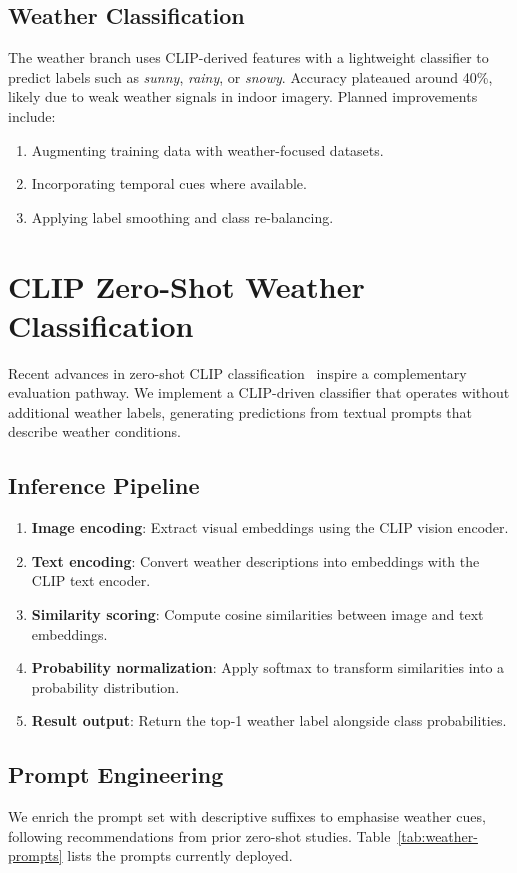 \documentclass[10pt,twocolumn]{article}
\begin{document}
\subsection{Weather Classification}
The weather branch uses CLIP-derived features with a lightweight classifier to predict labels such as \emph{sunny}, \emph{rainy}, or \emph{snowy}. Accuracy plateaued around 40\%, likely due to weak weather signals in indoor imagery. Planned improvements include:
\begin{enumerate}[leftmargin=1.5em]
    \item Augmenting training data with weather-focused datasets.
    \item Incorporating temporal cues where available.
    \item Applying label smoothing and class re-balancing.
\end{enumerate}

\section{CLIP Zero-Shot Weather Classification}
Recent advances in zero-shot CLIP classification~\cite{sammani2024interpreting,qian2024online} inspire a complementary evaluation pathway. We implement a CLIP-driven classifier that operates without additional weather labels, generating predictions from textual prompts that describe weather conditions.

\subsection{Inference Pipeline}
\begin{enumerate}[leftmargin=1.5em]
    \item \textbf{Image encoding}: Extract visual embeddings using the CLIP vision encoder.
    \item \textbf{Text encoding}: Convert weather descriptions into embeddings with the CLIP text encoder.
    \item \textbf{Similarity scoring}: Compute cosine similarities between image and text embeddings.
    \item \textbf{Probability normalization}: Apply softmax to transform similarities into a probability distribution.
    \item \textbf{Result output}: Return the top-1 weather label alongside class probabilities.
\end{enumerate}

\subsection{Prompt Engineering}
We enrich the prompt set with descriptive suffixes to emphasise weather cues, following recommendations from prior zero-shot studies. Table~\ref{tab:weather-prompts} lists the prompts currently deployed.
\end{document}
